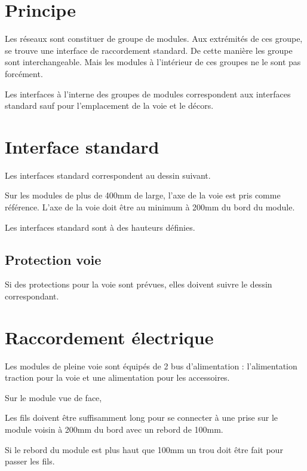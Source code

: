 
\section{Principe}

Les réseaux sont constituer de groupe de modules. 
Aux extrémités de ces groupe, se trouve une interface de raccordement standard. 
De cette manière les groupe sont interchangeable. 
Mais les modules à l'intérieur de ces groupes ne le sont pas forcément. 

Les interfaces à l'interne des groupes de modules correspondent aux interfaces standard sauf pour l’emplacement de la voie et le décors.

\section{Interface standard}

Les interfaces standard correspondent au dessin suivant.

Sur les modules de plus de 400mm de large, l'axe de la voie est pris comme référence.
L'axe de la voie doit être au minimum à 200mm du bord du module.

Les interfaces standard sont à des hauteurs définies.

\subsection{Protection voie}

Si des protections pour la voie sont prévues, elles doivent suivre le dessin correspondant.

\section{Raccordement électrique}

Les modules de pleine voie sont équipés de 2 bus d'alimentation : l'alimentation traction pour la voie et une alimentation pour les accessoires.

Sur le module vue de face,

Les fils doivent être suffisamment long pour se connecter à une prise sur le module voisin à 200mm du bord avec un rebord de 100mm.

Si le rebord du module est plus haut que 100mm un trou doit être fait pour passer les fils.


